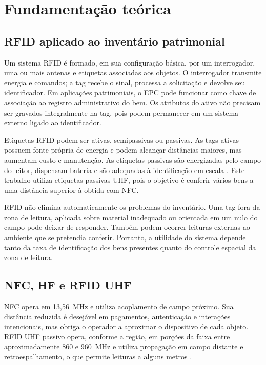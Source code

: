 %
%

\chapter{Fundamentação teórica}
\label{cap:fundamentacao}

\section{RFID aplicado ao inventário patrimonial}

Um sistema RFID é formado, em sua configuração básica, por um interrogador, uma ou mais antenas e etiquetas associadas aos objetos. O interrogador transmite energia e comandos; a tag recebe o sinal, processa a solicitação e devolve seu identificador. Em aplicações patrimoniais, o EPC pode funcionar como chave de associação ao registro administrativo do bem. Os atributos do ativo não precisam ser gravados integralmente na tag, pois podem permanecer em um sistema externo ligado ao identificador.

Etiquetas RFID podem ser ativas, semipassivas ou passivas. As tags ativas possuem fonte própria de energia e podem alcançar distâncias maiores, mas aumentam custo e manutenção. As etiquetas passivas são energizadas pelo campo do leitor, dispensam bateria e são adequadas à identificação em escala \cite{chawla2007passive}. Este trabalho utiliza etiquetas passivas UHF, pois o objetivo é conferir vários bens a uma distância superior à obtida com NFC.

RFID não elimina automaticamente os problemas do inventário. Uma tag fora da zona de leitura, aplicada sobre material inadequado ou orientada em um nulo do campo pode deixar de responder. Também podem ocorrer leituras externas ao ambiente que se pretendia conferir. Portanto, a utilidade do sistema depende tanto da taxa de identificação dos bens presentes quanto do controle espacial da zona de leitura.

\section{NFC, HF e RFID UHF}

NFC opera em 13,56~MHz e utiliza acoplamento de campo próximo. Sua distância reduzida é desejável em pagamentos, autenticação e interações intencionais, mas obriga o operador a aproximar o dispositivo de cada objeto. RFID UHF passivo opera, conforme a região, em porções da faixa entre aproximadamente 860 e 960~MHz e utiliza propagação em campo distante e retroespalhamento, o que permite leituras a alguns metros \cite{turner2007nearfield,rao2005uhf}.

